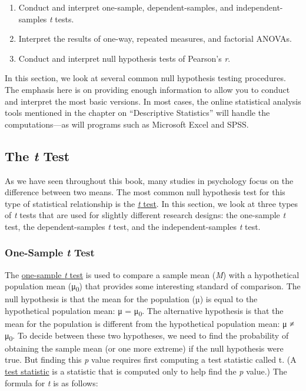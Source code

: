 \documentclass[
]{krantz}
\providecommand{\tightlist}{%
  \setlength{\itemsep}{0pt}\setlength{\parskip}{0pt}}
\begin{document}
\begin{enumerate}
\def\labelenumi{\arabic{enumi}.}
\tightlist
\item
  Conduct and interpret one-sample, dependent-samples, and independent-samples \emph{t} tests.
\item
  Interpret the results of one-way, repeated measures, and factorial ANOVAs.
\item
  Conduct and interpret null hypothesis tests of Pearson's \emph{r}.
\end{enumerate}

In this section, we look at several common null hypothesis testing procedures. The emphasis here is on providing enough information to allow you to conduct and interpret the most basic versions. In most cases, the online statistical analysis tools mentioned in the chapter on ``Descriptive Statistics'' will handle the computations---as will programs such as Microsoft Excel and SPSS.

\subsection*{\texorpdfstring{The \emph{t} Test}{The t Test}}\label{the-t-test}


As we have seen throughout this book, many studies in psychology focus on the difference between two means. The most common null hypothesis test for this type of statistical relationship is the \hyperref[t-test]{\emph{t} test}. In this section, we look at three types of \emph{t} tests that are used for slightly different research designs: the one-sample \emph{t} test, the dependent-samples \emph{t} test, and the independent-samples \emph{t} test.

\subsubsection*{\texorpdfstring{One-Sample \emph{t} Test}{One-Sample t Test}}\label{one-sample-t-test}


The \hyperref[one-sample-t-test]{one-sample \emph{t} test} is used to compare a sample mean (\emph{M}) with a hypothetical population mean (μ\textsubscript{0}) that provides some interesting standard of comparison. The null hypothesis is that the mean for the population (µ) is equal to the hypothetical population mean: μ = μ\textsubscript{0}. The alternative hypothesis is that the mean for the population is different from the hypothetical population mean: μ ≠ μ\textsubscript{0}. To decide between these two hypotheses, we need to find the probability of obtaining the sample mean (or one more extreme) if the null hypothesis were true. But finding this \emph{p} value requires first computing a test statistic called t. (A \hyperref[test-statistic]{test statistic} is a statistic that is computed only to help find the \emph{p} value.) The formula for \emph{t} is as follows:
\end{document}
